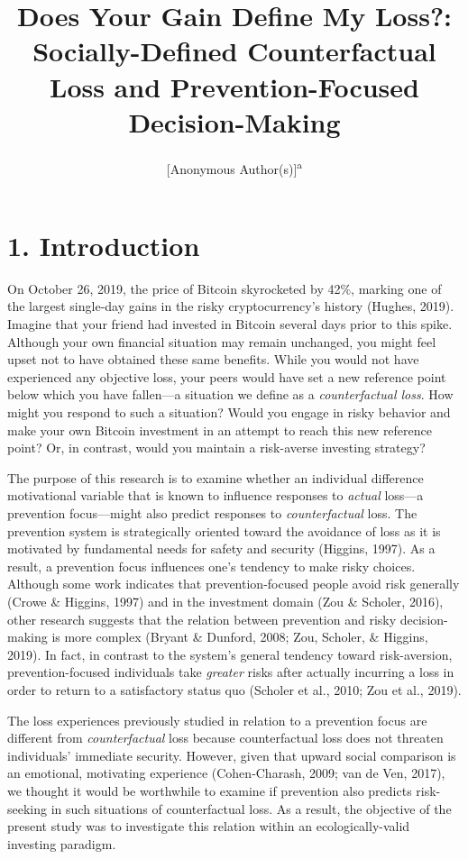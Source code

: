 \documentclass[man,floatsintext]{apa6}
\title{Does Your Gain Define My Loss?: Socially-Defined Counterfactual Loss and Prevention-Focused Decision-Making}
\author{{[}Anonymous Author(s){]}\textsuperscript{a}}
\date{}
\affiliation{
\vspace{0.5cm}
\textsuperscript{a} [Anonymized Institution(s)]}
\begin{document}
\maketitle

\hypertarget{introduction}{%
\section{1. Introduction}\label{introduction}}

On October 26, 2019, the price of Bitcoin skyrocketed by 42\%, marking one of the largest single-day gains in the risky cryptocurrency's history (Hughes, 2019). Imagine that your friend had invested in Bitcoin several days prior to this spike. Although your own financial situation may remain unchanged, you might feel upset not to have obtained these same benefits. While you would not have experienced any objective loss, your peers would have set a new reference point below which you have fallen---a situation we define as a \emph{counterfactual loss}. How might you respond to such a situation? Would you engage in risky behavior and make your own Bitcoin investment in an attempt to reach this new reference point? Or, in contrast, would you maintain a risk-averse investing strategy?

The purpose of this research is to examine whether an individual difference motivational variable that is known to influence responses to \emph{actual} loss---a prevention focus---might also predict responses to \emph{counterfactual} loss. The prevention system is strategically oriented toward the avoidance of loss as it is motivated by fundamental needs for safety and security (Higgins, 1997). As a result, a prevention focus influences one's tendency to make risky choices. Although some work indicates that prevention-focused people avoid risk generally (Crowe \& Higgins, 1997) and in the investment domain (Zou \& Scholer, 2016), other research suggests that the relation between prevention and risky decision-making is more complex (Bryant \& Dunford, 2008; Zou, Scholer, \& Higgins, 2019). In fact, in contrast to the system's general tendency toward risk-aversion, prevention-focused individuals take \emph{greater} risks after actually incurring a loss in order to return to a satisfactory status quo (Scholer et al., 2010; Zou et al., 2019).

The loss experiences previously studied in relation to a prevention focus are different from \emph{counterfactual} loss because counterfactual loss does not threaten individuals' immediate security. However, given that upward social comparison is an emotional, motivating experience (Cohen‐Charash, 2009; van de Ven, 2017), we thought it would be worthwhile to examine if prevention also predicts risk-seeking in such situations of counterfactual loss. As a result, the objective of the present study was to investigate this relation within an ecologically-valid investing paradigm.
\end{document}
